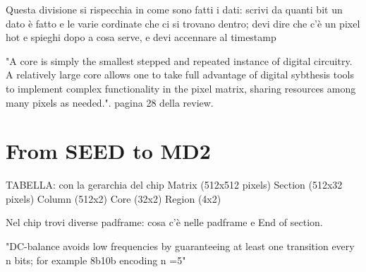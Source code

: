 Questa divisione si rispecchia in come sono fatti i dati: scrivi da quanti bit un
dato è fatto e le varie cordinate che ci si trovano dentro; devi dire che c'è un pixel hot
e spieghi dopo a cosa serve, e devi accennare al timestamp

"A core is simply the smallest stepped and repeated instance of digital circuitry.
A relatively large core allows one to take full advantage of digital sybthesis tools
to implement complex functionality in the pixel matrix, sharing resources among
many pixels as needed.".
pagina 28 della review.\\

\section{From SEED to MD2}


TABELLA: con la gerarchia del chip
Matrix (512x512 pixels)
Section (512x32 pixels)
Column (512x2)
Core (32x2)
Region (4x2)

Nel chip trovi diverse padframe: cosa c'è nelle padframe e End of section.

"DC-balance avoids low frequencies by guaranteeing at least one transition every
n bits; for example 8b10b encoding n =5"

